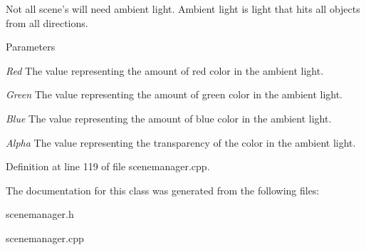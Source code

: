 Not all scene's will need ambient light. Ambient light is light that hits all objects from all directions. 
\begin{DoxyParams}{Parameters}
\item[{\em Red}]The value representing the amount of red color in the ambient light. \item[{\em Green}]The value representing the amount of green color in the ambient light. \item[{\em Blue}]The value representing the amount of blue color in the ambient light. \item[{\em Alpha}]The value representing the transparency of the color in the ambient light. \end{DoxyParams}


Definition at line 119 of file scenemanager.cpp.



The documentation for this class was generated from the following files:\begin{DoxyCompactItemize}
\item 
scenemanager.h\item 
scenemanager.cpp\end{DoxyCompactItemize}
